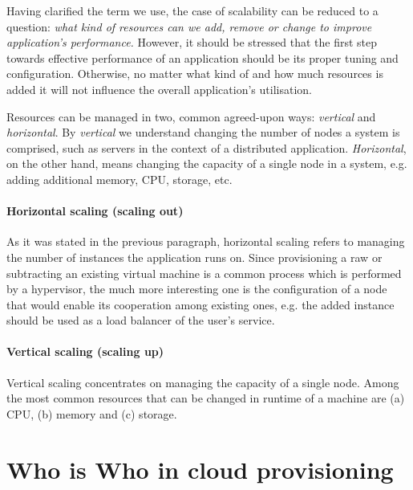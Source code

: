 \documentclass[twocolumn]{svjour3}          %
\begin{document}
Having clarified the term we use, the case of scalability can be reduced to a question: \emph{what kind of resources can we add, remove or change to improve application's performance.} However, it should be stressed that the first step towards effective performance of an application should be its proper tuning and configuration. Otherwise, no matter what kind of and how much resources is added it will not influence the overall application's utilisation.

Resources can be managed in two, common agreed-upon ways: \emph{vertical} and \emph{horizontal}. By \emph{vertical} we understand changing the number of nodes a system is comprised, such as servers in the context of a distributed application. \emph{Horizontal}, on the other hand, means changing the capacity of a single node in a system, e.g. adding additional memory, CPU, storage, etc.

\paragraph{Horizontal scaling (scaling out)} As it was stated in the previous paragraph, horizontal scaling refers to managing the number of instances the application runs on. Since provisioning a raw or subtracting an existing virtual machine is a common process which is performed by a hypervisor, the much more interesting one is the configuration of a node that would enable its cooperation among existing ones, e.g. the added instance should be used as a load balancer of the user's service.

\paragraph{Vertical scaling (scaling up)} Vertical scaling concentrates on managing the capacity of a single node. Among the most common resources that can be changed in runtime of a machine are (a) CPU, (b) memory and (c) storage.


\section{Who is Who in cloud provisioning}
\end{document}
